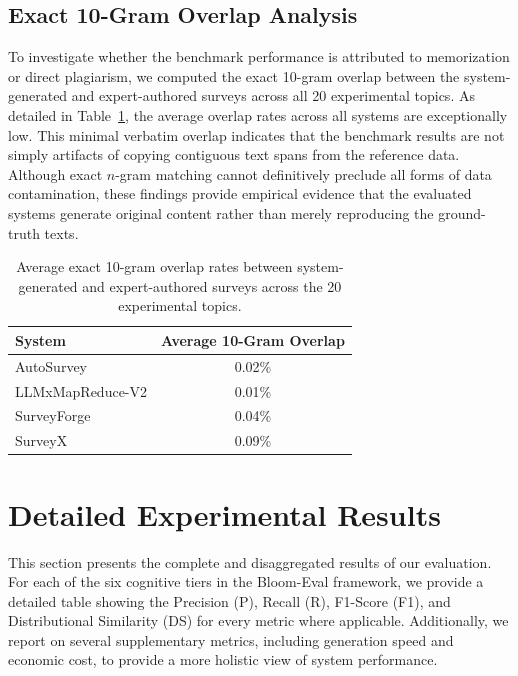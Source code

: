 \documentclass[11pt]{article}
\begin{document}
\subsection{Exact 10-Gram Overlap Analysis}

To investigate whether the benchmark performance is attributed to memorization or direct plagiarism, we computed the exact 10-gram overlap between the system-generated and expert-authored surveys across all 20 experimental topics. As detailed in Table~\ref{tab:ten_gram_overlap}, the average overlap rates across all systems are exceptionally low. This minimal verbatim overlap indicates that the benchmark results are not simply artifacts of copying contiguous text spans from the reference data. Although exact $n$-gram matching cannot definitively preclude all forms of data contamination, these findings provide empirical evidence that the evaluated systems generate original content rather than merely reproducing the ground-truth texts.

\begin{table}[t]
\centering
\small
\begin{tabular}{lc}
\toprule
\textbf{System} & \textbf{Average 10-Gram Overlap} \\
\midrule
AutoSurvey & 0.02\% \\
LLMxMapReduce-V2 & 0.01\% \\
SurveyForge & 0.04\% \\
SurveyX & 0.09\% \\
\bottomrule
\end{tabular}
\caption{Average exact 10-gram overlap rates between system-generated and expert-authored surveys across the 20 experimental topics.}
\label{tab:ten_gram_overlap}
\end{table}

\section{Detailed Experimental Results}
\label{sec:appendix_detailed_results}

This section presents the complete and disaggregated results of our evaluation. For each of the six cognitive tiers in the Bloom-Eval framework, we provide a detailed table showing the Precision (P), Recall (R), F1-Score (F1), and Distributional Similarity (DS) for every metric where applicable. Additionally, we report on several supplementary metrics, including generation speed and economic cost, to provide a more holistic view of system performance.
\end{document}
